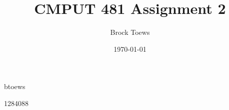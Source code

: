 \documentclass[11pt]{article}
\title{CMPUT 481 Assignment 2}
\author{Brock Toews}
\date{\today}
\begin{document}
\maketitle
\begin{center}
btoews

1284088
\end{center}
\thispagestyle{empty}
\pagebreak
\setcounter{page}{1}
\listoffigures
\tableofcontents
\pagebreak
\end{document}
